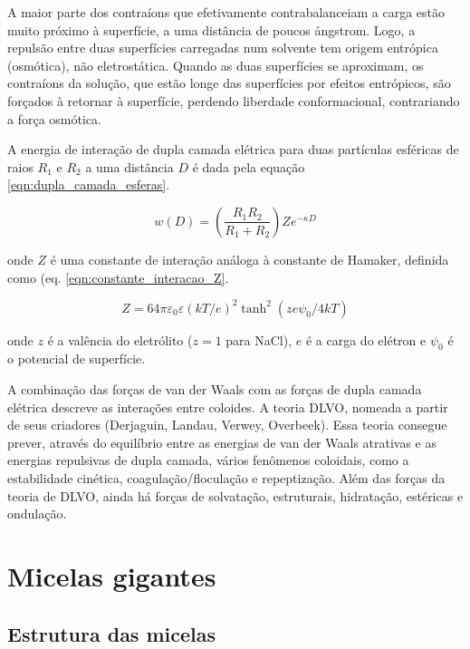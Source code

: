 	A maior parte dos contraíons que efetivamente contrabalanceiam a carga estão muito próximo à superfície, a uma distância de poucos \aa ngstrom. Logo, a repulsão entre duas superfícies carregadas num solvente tem origem entrópica (osmótica), não eletrostática. Quando as duas superfícies se aproximam, os contraíons da solução, que estão longe das superfícies por efeitos entrópicos, são forçados à retornar à superfície, perdendo liberdade conformacional, contrariando a força osmótica.
	
	A energia de interação de dupla camada elétrica para duas partículas esféricas de raios \(R_1\) e \(R_2\) a uma distância \(D\) é dada pela equação \ref{eqn:dupla_camada_esferas}.
	
	\begin{equation}
		w(D) = \left(  \dfrac{R_1R_2}{R_1+R_2}  \right)Ze^{-\kappa D}
		\label{eqn:dupla_camada_esferas}
	\end{equation}
	
	\noindent onde \(Z\) é uma constante de interação análoga à constante de Hamaker, definida como (eq. \ref{eqn:constante_interacao_Z}.
	
	\begin{equation}
		Z = 64 \pi \varepsilon _ { 0 } \varepsilon ( k T / e ) ^ { 2 } \tanh ^ { 2 } \left( z e \psi _ { 0 } / 4 k T \right)
		\label{eqn:constante_interacao_Z}
	\end{equation}
	
	\noindent onde \(z\) é a valência do eletrólito (\(z=1\) para NaCl), \(e\) é a carga do elétron e \(\psi_0\) é o potencial de superfície.
	
	A combinação das forças de van der Waals com as forças de dupla camada elétrica descreve as interações entre coloides. A teoria DLVO, nomeada a partir de seus criadores (Derjaguin, Landau, Verwey, Overbeek). Essa teoria consegue prever, através do equilíbrio entre as energias de van der Waals atrativas e as energias repulsivas de dupla camada, vários fenômenos coloidais, como a estabilidade cinética, coagulação/floculação e repeptização. Além das forças da teoria de DLVO, ainda há forças de solvatação, estruturais, hidratação, estéricas e ondulação.
	

	\chapter{Micelas gigantes}
		\label{chap:micelas_gigantes}
		\section{Estrutura das micelas}  %
		
